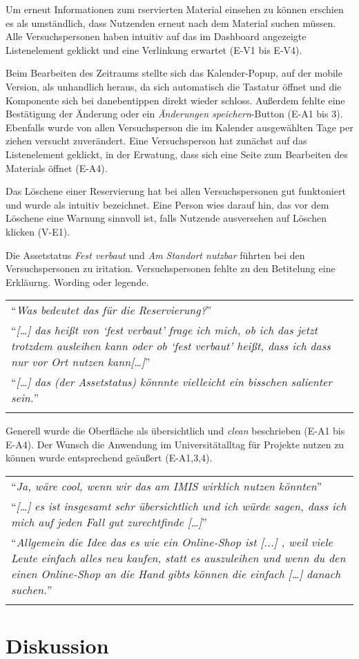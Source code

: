Um erneut Informationen zum rservierten Material einsehen zu können erschien es
als umständlich, dass Nutzenden erneut nach dem Material suchen müssen. Alle
Versuchspersonen haben intuitiv auf das im Dashboard angezeigte Listenelement
geklickt  und eine Verlinkung erwartet (E-V1 bis E-V4). 

 Beim Bearbeiten des Zeitraums stellte sich das Kalender-Popup, auf der mobile
Version, als unhandlich heraus, da sich automatisch die Tastatur öffnet und die
Komponente sich bei danebentippen direkt wieder schloss. Außerdem fehlte eine
Bestätigung der Änderung oder ein \textit{Änderungen speichern}-Button (E-A1 bis
3). Ebenfalls wurde von allen Versuchsperson die im Kalender ausgewählten Tage
per ziehen versucht zuverändert. Eine Versuchsperson hat zunächst auf das
Listenelement geklickt, in der Erwatung, dass sich eine Seite zum Bearbeiten des
Materials öffnet (E-A4).

Das Löschene einer Reservierung hat bei allen Versuchspersonen gut funktoniert
und wurde als intuitiv bezeichnet. Eine Person wies darauf hin, das vor dem
Löschene eine Warnung sinnvoll ist, falls Nutzende ausversehen auf Löschen
klicken (V-E1). 

Die Assetstatus \textit{Fest verbaut} und \textit{Am Standort nutzbar} führten
bei den Versuchspersonen zu iritation. Versuchspersonen fehlte zu den Betitelung
eine Erkläurng.  Wording oder legende.

\begin{longtable}{p{}} \arrayrulecolor{maincolor}\hline
  \enquote{\textit{Was bedeutet das für die Reservierung?}} \\
  \enquote{\textit{[\dots] das heißt von \enquote{fest verbaut} frage ich mich,
  ob ich das jetzt trotzdem ausleihen kann oder ob \enquote{fest verbaut} heißt,
  dass ich dass nur vor Ort nutzen kann[\dots]}} \\
  \enquote{\textit{[\dots] das (der Assetstatus) könnnte vielleicht ein bisschen salienter sein.}}
  \\
  \arrayrulecolor{maincolor}\hline
\end{longtable}

Generell wurde die Oberfläche als übersichtlich und \textit{clean} beschrieben
(E-A1 bis E-A4). Der Wunsch die Anwendung im Universitätalltag für Projekte
nutzen zu können wurde entsprechend geäußert (E-A1,3,4).

\begin{longtable}{p{}} \arrayrulecolor{maincolor}\hline
  \enquote{\textit{Ja, wäre cool, wenn wir das am IMIS wirklich nutzen
  könnten}}\\
  \enquote{\textit{[\dots] es ist insgesamt sehr übersichtlich und ich würde
  sagen, dass ich mich auf jeden Fall gut zurechtfinde [\dots]}} \\
  \enquote{\textit{Allgemein die Idee das es wie ein Online-Shop ist [...] , weil viele
  Leute einfach alles neu kaufen, statt es auszuleihen und wenn du den einen Online-Shop an die
  Hand gibts können die einfach [\dots] danach suchen.}} \\
  \arrayrulecolor{maincolor}\hline
\end{longtable}



\section{Diskussion}